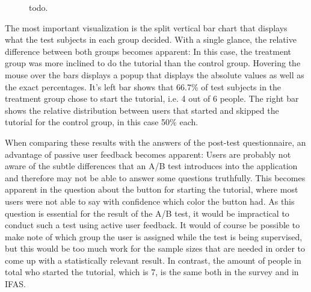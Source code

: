 \begin{figure}[h]
        \caption{todo.}
        \label{figure:evaluation:user:dashboard-ab-test}
\end{figure}

The most important visualization is the split vertical bar chart that displays what the test subjects in each group decided.
With a single glance, the relative difference between both groups becomes apparent: In this case, the treatment group was more inclined to do the tutorial than the control group.
Hovering the mouse over the bars displays a popup that displays the absolute values as well as the exact percentages.
It's left bar shows that 66.7\% of test subjects in the treatment group chose to start the tutorial, i.e. 4 out of 6 people.
The right bar shows the relative distribution between users that started and skipped the tutorial for the control group, in this case 50\% each.

When comparing these results with the answers of the post-test questionnaire, an advantage of passive user feedback becomes apparent:
Users are probably not aware of the subtle differences that an A/B test introduces into the application and therefore may not be able to answer some questions truthfully.
This becomes apparent in the question about the button for starting the tutorial, where most users were not able to say with confidence which color the button had.
As this question is essential for the result of the A/B test, it would be impractical to conduct such a test using active user feedback.
It would of course be possible to make note of which group the user is assigned while the test is being supervised, but this would be too much work for the sample sizes that are needed in order to come up with a statistically relevant result.
In contrast, the amount of people in total who started the tutorial, which is 7, is the same both in the survey and in \ac{IFAS}.

